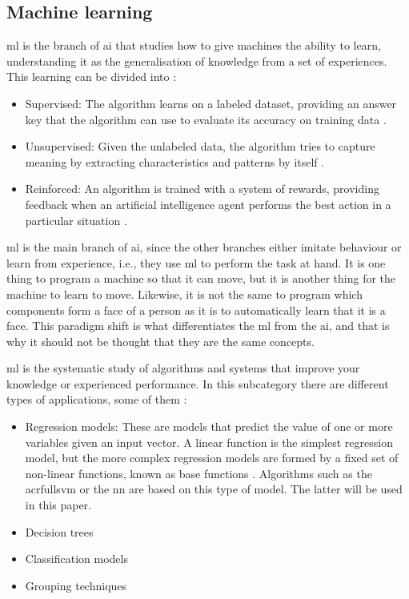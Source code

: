 \subsection{Machine learning}

\acrfull{ml} is the branch of \acrshort{ai} that studies how to give machines the ability to learn, understanding it as the generalisation of knowledge from a set of experiences. This learning can be divided into \cite{amodernapproach}:
\begin{itemize}
\item Supervised: The algorithm learns on a labeled dataset, providing an answer key that the algorithm can use to evaluate its accuracy on training data \cite{nvidia}.
\item Unsupervised: Given the unlabeled data, the algorithm tries to capture meaning by extracting characteristics and patterns by itself \cite{nvidia}.
\item Reinforced: An algorithm is trained with a system of rewards, providing feedback when an artificial intelligence agent performs the best action in a particular situation \cite{nvidia}.
\end{itemize}


\acrlong{ml} is the main branch of \acrshort{ai}, since the other branches either imitate behaviour or learn from experience, i.e., they use \acrshort{ml} to perform the task at hand. It is one thing to program a machine so that it can move, but it is another thing for the machine to learn to move. Likewise, it is not the same to program which components form a face of a person as it is to automatically learn that it is a face. This paradigm shift is what differentiates the \acrshort{ml} from the \acrshort{ai}, and that is why it should not be thought that they are the same concepts.
\newline


\acrlong{ml} is the systematic study of algorithms and systems that improve your knowledge or experienced performance. In this subcategory there are different types of applications, some of them \cite{amodernapproach}:
\begin{itemize}
\item Regression models: These are models that predict the value of one or more variables given an input vector. A linear function is the simplest regression model, but the more complex regression models are formed by a fixed set of non-linear functions, known as base functions \cite{flach}. Algorithms such as the acrfull{svm} or the \acrfull{nn} are based on this type of model. The latter will be used in this paper.

\item Decision trees

\item Classification models
\item Grouping techniques
\end{itemize}

